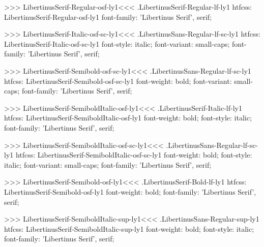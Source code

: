 >>>
\<LibertinusSerif-Regular-osf-ly1\><<<
.LibertinusSerif-Regular-lf-ly1
htfcss:  LibertinusSerif-Regular-osf-ly1  font-family: 'Libertinus Serif', serif;

>>>
\<LibertinusSerif-Italic-osf-sc-ly1\><<<
.LibertinusSans-Regular-lf-sc-ly1
htfcss:  LibertinusSerif-Italic-osf-sc-ly1  font-style: italic; font-variant: small-caps; font-family: 'Libertinus Serif', serif;

>>>
\<LibertinusSerif-Semibold-osf-sc-ly1\><<<
.LibertinusSans-Regular-lf-sc-ly1
htfcss:  LibertinusSerif-Semibold-osf-sc-ly1  font-weight: bold; font-variant: small-caps; font-family: 'Libertinus Serif', serif;

>>>
\<LibertinusSerif-SemiboldItalic-osf-ly1\><<<
.LibertinusSerif-Italic-lf-ly1
htfcss:  LibertinusSerif-SemiboldItalic-osf-ly1  font-weight: bold; font-style: italic; font-family: 'Libertinus Serif', serif;

>>>
\<LibertinusSerif-SemiboldItalic-osf-sc-ly1\><<<
.LibertinusSans-Regular-lf-sc-ly1
htfcss:  LibertinusSerif-SemiboldItalic-osf-sc-ly1  font-weight: bold; font-style: italic; font-variant: small-caps; font-family: 'Libertinus Serif', serif;

>>>
\<LibertinusSerif-Semibold-osf-ly1\><<<
.LibertinusSerif-Bold-lf-ly1
htfcss:  LibertinusSerif-Semibold-osf-ly1  font-weight: bold; font-family: 'Libertinus Serif', serif;

>>>
\<LibertinusSerif-SemiboldItalic-sup-ly1\><<<
.LibertinusSans-Regular-sup-ly1
htfcss:  LibertinusSerif-SemiboldItalic-sup-ly1  font-weight: bold; font-style: italic; font-family: 'Libertinus Serif', serif;

